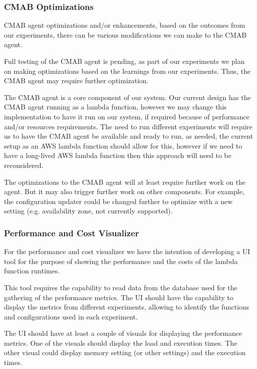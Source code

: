 \documentclass[conference]{IEEEtran}
\begin{document}
\subsubsection{CMAB Optimizations}

CMAB agent optimizations and/or enhancements, based on the outcomes from our experiments, there can be various modifications we can make to the CMAB agent.

Full testing of the CMAB agent is pending, as part of our experiments we plan on making optimizations based on the learnings from our experiments. Thus, the CMAB agent may require further optimization.

The CMAB agent is a core component of our system. Our current design has the CMAB agent running as a lambda function, however we may change this implementation to have it run on our system, if required because of performance and/or resources requirements. The need to run different experiments will require us to have the CMAB agent be available and ready to run, as needed, the current setup as an AWS lambda function should allow for this, however if we need to have a long-lived AWS lambda function then this approach will need to be reconsidered.

The optimizations to the CMAB agent will at least require further work on the agent. But it may also trigger further work on other components. For example, the configuration updater could be changed further to optimize with a new setting (e.g. availability zone, not currently supported).

\subsubsection{Performance and Cost Visualizer}

For the performance and cost visualizer we have the intention of developing a UI tool for the purpose of showing the performance and the costs of the lambda function runtimes.

This tool requires the capability to read data from the database used for the gathering of the performance metrics. The UI should have the capability to display the metrics from different experiments, allowing to identify the functions and configurations used in each experiment.

The UI should have at least a couple of visuals for displaying the performance metrics. One of the visuals should display the load and execution times. The other visual could display memory setting (or other settings) and the execution times.
\end{document}
